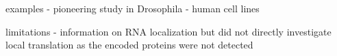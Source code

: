 examples
- pioneering study in Drosophila
- human cell lines

limitations
- information on RNA localization but did not directly investigate local translation as the encoded proteins were not detected








